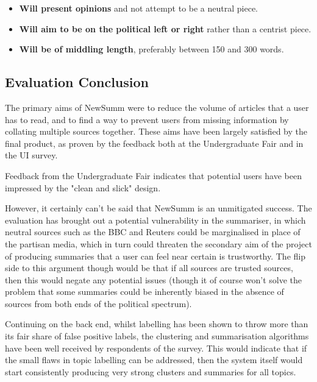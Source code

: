 \documentclass[12pt]{article}
\begin{document}
\begin{itemize}
	\item \textbf{Will present opinions} and not attempt to be a neutral piece. 
	\item \textbf{Will aim to be on the political left or right} rather than a centrist piece.
	\item \textbf{Will be of middling length}, preferably between 150 and 300 words.
\end{itemize}

\subsection{Evaluation Conclusion}

The primary aims of NewSumm were to reduce the volume of articles that a user has to read, and to find a way to prevent users from missing information by collating multiple sources together. These aims have been largely satisfied by the final product, as proven by the feedback both at the Undergraduate Fair and in the UI survey.

Feedback from the Undergraduate Fair indicates that potential users have been impressed by the "clean and slick" design.

However, it certainly can't be said that NewSumm is an unmitigated success. The evaluation has brought out a potential vulnerability in the summariser, in which neutral sources such as the BBC and Reuters could be marginalised in place of the partisan media, which in turn could threaten the secondary aim of the project of producing summaries that a user can feel near certain is trustworthy. The flip side to this argument though would be that if all sources are trusted sources, then this would negate any potential issues (though it of course won't solve the problem that some summaries could be inherently biased in the absence of sources from both ends of the political spectrum).

Continuing on the back end, whilst labelling has been shown to throw more than its fair share of false positive labels, the clustering and summarisation algorithms have been well received by respondents of the survey. This would indicate that if the small flaws in topic labelling can be addressed, then the system itself would start consistently producing very strong clusters and summaries for all topics.

\end{document}

